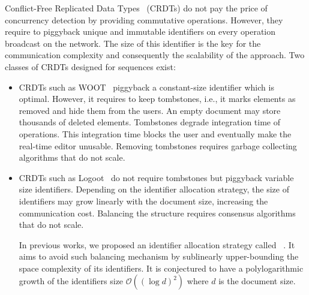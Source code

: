 Conflict-Free Replicated Data Types~\cite{shapiro2011comprehensive} (CRDTs) do
not pay the price of concurrency detection by providing commutative
operations. However, they require to piggyback unique and immutable identifiers
on every operation broadcast on the network. The size of this identifier is the
key for the communication complexity and consequently the scalability of the
approach. Two classes of CRDTs designed for sequences exist:
\begin{itemize}
\item CRDTs such as WOOT~\cite{oster2006data} piggyback a constant-size
  identifier which is optimal. However, it requires to keep tombstones, i.e., it
  marks elements as removed and hide them from the users. An empty document may
  store thousands of deleted elements. Tombstones degrade integration time of
  operations. This integration time blocks the user and eventually make the
  real-time editor unusable. Removing tombstones requires garbage
  collecting algorithms that do not scale.
\item CRDTs such as Logoot~\cite{weiss2010logootundo} do not require tombstones
  but piggyback variable size identifiers. Depending on the identifier
  allocation strategy, the size of identifiers may grow linearly with the
  document size, increasing the communication cost. Balancing the structure
  requires consensus algorithms that do not scale.

  In previous works, we proposed an identifier allocation strategy called
  \LSEQ~\cite{nedelec2013concurrency, nedelec2013lseq}. It aims to avoid such
  balancing mechanism by sublinearly upper-bounding the space complexity of its
  identifiers. It is conjectured to have a polylogarithmic growth of the
  identifiers size $\mathcal{O}((\log d)^2)$ where $d$ is the document
  size.
\end{itemize}

